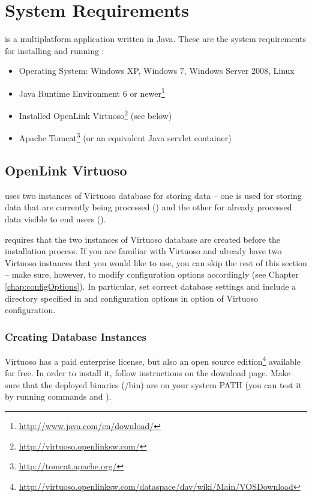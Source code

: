 \chapter{System Requirements}
\label{chap:requirements}
\odcs is a multiplatform application written in Java. These are the system requirements for installing and running \odcs:

\begin{itemize}
  \item Operating System: Windows XP, Windows 7, Windows Server 2008, Linux
  \item Java Runtime Environment 6 or newer\footnote{\url{http://www.java.com/en/download/}}
  \item Installed OpenLink Virtuoso\footnote{\url{http://virtuoso.openlinksw.com/}} (see below)
  \item Apache Tomcat\footnote{\url{http://tomcat.apache.org/}} (or an equivalent Java servlet container)
\end{itemize}


\section{OpenLink Virtuoso}
\label{sec:virtuoso}
\odcs uses two instances of Virtuoso database for storing data -- one is used for storing data that are currently being processed () and the other for already processed data visible to end users (). 

\odcs requires that the two instances of Virtuoso database are created before the installation process. If you are familiar with Virtuoso and already have two Virtuoso instances that you would like to use, you can skip the rest of this section -- make sure, however, to modify \odcs configuration options accordingly  (see Chapter \ref{chap:configOptions}). In particular, set correct database settings and include a directory specified in  and  configuration options in  option of Virtuoso configuration.

\subsection{Creating Database Instances}
Virtuoso has a paid enterprise license, but also an open source edition\footnote{\url{http://virtuoso.openlinksw.com/dataspace/dav/wiki/Main/VOSDownload}} available for free. In order to install it, follow instructions on the download page. Make sure that the deployed binaries (/bin) are on your system PATH (you can test it by running commands  and ).

